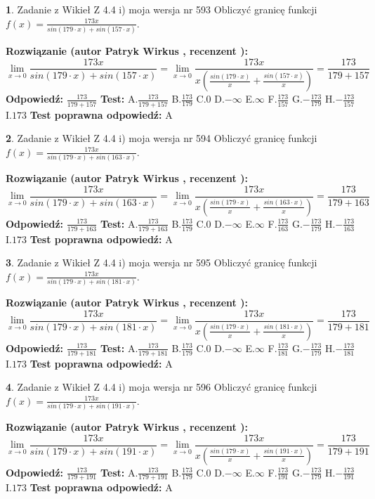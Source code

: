 \documentclass[12pt, a4paper]{article}
\theoremstyle{definition} %
\newtheorem{zad}{}
\newcommand{\zadStart}[1]{\begin{zad}#1\newline}
\newcommand{\zadStop}{\end{zad}}
\newcommand{\rozwStart}[2]{\noindent \textbf{Rozwiązanie (autor #1 , recenzent #2): }\newline}
\newcommand{\rozwStop}{\newline}
\newcommand{\odpStart}{\noindent \textbf{Odpowiedź:}\newline}
\newcommand{\odpStop}{\newline}
\newcommand{\testStart}{\noindent \textbf{Test:}\newline}
\newcommand{\testStop}{\newline}
\newcommand{\kluczStart}{\noindent \textbf{Test poprawna odpowiedź:}\newline}
\newcommand{\kluczStop}{\newline}
\begin{document}
\zadStart{Zadanie z Wikieł Z 4.4 i) moja wersja nr 593}
Obliczyć granicę funkcji $f(x)=\frac{173x}{sin(179\cdot x) +sin(157\cdot x)}$.
\zadStop
\rozwStart{Patryk Wirkus}{}
$$\lim\limits_{x\to 0}\frac{173x}{sin(179\cdot x) +sin(157\cdot x)}=\lim\limits_{x\to 0}\frac{173x}{x(\frac{sin(179\cdot x)}{x}+\frac{sin(157\cdot x)}{x})}=\frac{173}{179+157}$$
\rozwStop
\odpStart
$\frac{173}{179+157}$
\odpStop
\testStart
A.$\frac{173}{179+157}$
B.$\frac{173}{179}$
C.$0$
D.$-\infty$
E.$\infty$
F.$\frac{173}{157}$
G.$-\frac{173}{179}$
H.$-\frac{173}{157}$
I.$173$
\testStop
\kluczStart
A
\kluczStop



\zadStart{Zadanie z Wikieł Z 4.4 i) moja wersja nr 594}
Obliczyć granicę funkcji $f(x)=\frac{173x}{sin(179\cdot x) +sin(163\cdot x)}$.
\zadStop
\rozwStart{Patryk Wirkus}{}
$$\lim\limits_{x\to 0}\frac{173x}{sin(179\cdot x) +sin(163\cdot x)}=\lim\limits_{x\to 0}\frac{173x}{x(\frac{sin(179\cdot x)}{x}+\frac{sin(163\cdot x)}{x})}=\frac{173}{179+163}$$
\rozwStop
\odpStart
$\frac{173}{179+163}$
\odpStop
\testStart
A.$\frac{173}{179+163}$
B.$\frac{173}{179}$
C.$0$
D.$-\infty$
E.$\infty$
F.$\frac{173}{163}$
G.$-\frac{173}{179}$
H.$-\frac{173}{163}$
I.$173$
\testStop
\kluczStart
A
\kluczStop



\zadStart{Zadanie z Wikieł Z 4.4 i) moja wersja nr 595}
Obliczyć granicę funkcji $f(x)=\frac{173x}{sin(179\cdot x) +sin(181\cdot x)}$.
\zadStop
\rozwStart{Patryk Wirkus}{}
$$\lim\limits_{x\to 0}\frac{173x}{sin(179\cdot x) +sin(181\cdot x)}=\lim\limits_{x\to 0}\frac{173x}{x(\frac{sin(179\cdot x)}{x}+\frac{sin(181\cdot x)}{x})}=\frac{173}{179+181}$$
\rozwStop
\odpStart
$\frac{173}{179+181}$
\odpStop
\testStart
A.$\frac{173}{179+181}$
B.$\frac{173}{179}$
C.$0$
D.$-\infty$
E.$\infty$
F.$\frac{173}{181}$
G.$-\frac{173}{179}$
H.$-\frac{173}{181}$
I.$173$
\testStop
\kluczStart
A
\kluczStop



\zadStart{Zadanie z Wikieł Z 4.4 i) moja wersja nr 596}
Obliczyć granicę funkcji $f(x)=\frac{173x}{sin(179\cdot x) +sin(191\cdot x)}$.
\zadStop
\rozwStart{Patryk Wirkus}{}
$$\lim\limits_{x\to 0}\frac{173x}{sin(179\cdot x) +sin(191\cdot x)}=\lim\limits_{x\to 0}\frac{173x}{x(\frac{sin(179\cdot x)}{x}+\frac{sin(191\cdot x)}{x})}=\frac{173}{179+191}$$
\rozwStop
\odpStart
$\frac{173}{179+191}$
\odpStop
\testStart
A.$\frac{173}{179+191}$
B.$\frac{173}{179}$
C.$0$
D.$-\infty$
E.$\infty$
F.$\frac{173}{191}$
G.$-\frac{173}{179}$
H.$-\frac{173}{191}$
I.$173$
\testStop
\kluczStart
A
\kluczStop
\end{document}
